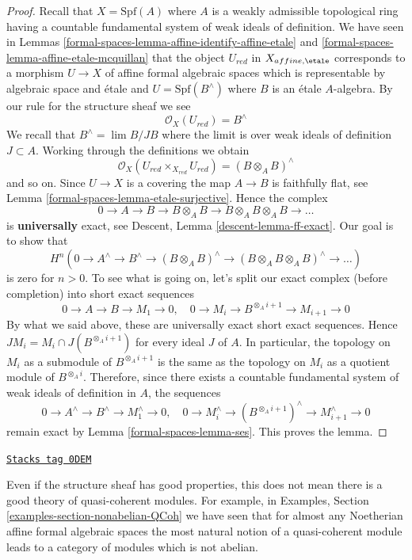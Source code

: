 \begin{proof}
\medskip\noindent
Recall that $X = \text{Spf}(A)$ where $A$ is a
weakly admissible topological ring having a countable
fundamental system of weak ideals of definition.
We have seen in Lemmas
\ref{formal-spaces-lemma-affine-identify-affine-etale} and
\ref{formal-spaces-lemma-affine-etale-mcquillan}
that the object $U_{red}$ in $X_{affine, \etale}$
corresponds to a morphism $U \to X$ of affine formal
algebraic spaces which is representable by algebraic space and \'etale
and $U = \text{Spf}(B^\wedge)$ where $B$ is an \'etale $A$-algebra.
By our rule for the structure sheaf we see
$$
\mathcal{O}_X(U_{red}) = B^\wedge
$$
We recall that $B^\wedge = \lim B/JB$ where the limit is over weak
ideals of definition $J \subset A$.
Working through the definitions we obtain
$$
\mathcal{O}_X(U_{red} \times_{X_{red}} U_{red}) = (B \otimes_A B)^\wedge
$$
and so on. Since $U \to X$ is a covering the map $A \to B$
is faithfully flat, see Lemma \ref{formal-spaces-lemma-etale-surjective}.
Hence the complex
$$
0 \to A \to B \to B \otimes_A B \to B \otimes_A B \otimes_A B \to \ldots
$$
is {\bf universally} exact, see Descent, Lemma \ref{descent-lemma-ff-exact}.
Our goal is to show that
$$
H^n(0 \to A^\wedge \to B^\wedge \to (B \otimes_A B)^\wedge
\to (B \otimes_A B \otimes_A B)^\wedge \to \ldots)
$$
is zero for $n > 0$. To see what is going on, let's split our
exact complex (before completion) into short exact sequences
$$
0 \to A \to B \to M_1 \to 0,\quad
0 \to M_i \to B^{\otimes_A i + 1} \to M_{i + 1} \to 0
$$
By what we said above, these are universally exact short exact
sequences. Hence $JM_i = M_i \cap J(B^{\otimes_A i + 1})$ for
every ideal $J$ of $A$. In particular, the
topology on $M_i$ as a submodule of $B^{\otimes_A i + 1}$
is the same as the topology on $M_i$ as a quotient module of
$B^{\otimes_A i}$. Therefore, since there exists a countable fundamental system
of weak ideals of definition in $A$, the sequences
$$
0 \to A^\wedge \to B^\wedge \to M_1^\wedge \to 0,\quad
0 \to M_i^\wedge \to (B^{\otimes_A i + 1})^\wedge \to M_{i + 1}^\wedge \to 0
$$
remain exact by Lemma \ref{formal-spaces-lemma-ses}. This proves the lemma.
\end{proof}

\begin{remark}
\label{formal-spaces-remark-bad-quasi-coherent}
\href{https://stacks.math.columbia.edu/tag/0DEM}{\texttt{Stacks tag 0DEM}}

Even if the structure sheaf has good properties, this does not
mean there is a good theory of quasi-coherent modules. For example,
in Examples, Section \ref{examples-section-nonabelian-QCoh}
we have seen that for almost any Noetherian affine formal algebraic spaces
the most natural notion of a quasi-coherent module leads to a
category of modules which is not abelian.
\end{remark}

